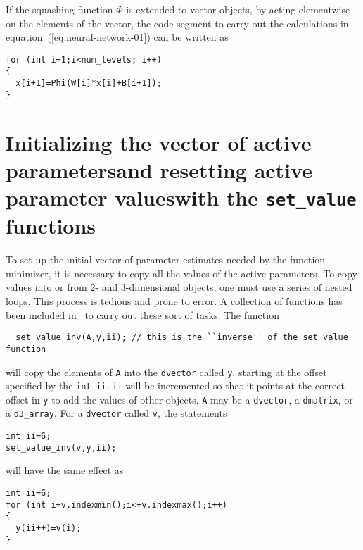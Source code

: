 \documentclass{admbmanual}
\begin{document}
If the squashing function $\Phi$ is extended to vector objects, by acting
elementwise on the elements of the vector, the code segment to carry out the
calculations in equation~(\ref{eq:neural-network-01}) %
can be written as
\begin{lstlisting}
for (int i=1;i<num_levels; i++)
{
  x[i+1]=Phi(W[i]*x[i]+B[i+1]);
}
\end{lstlisting}

\section{ Initializing the vector of active parameters\br and resetting
active parameter values\br with the \texttt{set\_value} functions}

To set up the initial vector of parameter estimates needed by the function
minimizer, it is necessary to copy all the values of the active parameters. To
copy values into or from 2- and 3-dimensional objects, one must use a series of
nested loops. This process is tedious and prone to error. A collection of
functions has been included in \scAD\ to carry out these sort of tasks. The
function
\begin{lstlisting}
  set_value_inv(A,y,ii); // this is the ``inverse'' of the set_value function
\end{lstlisting}
will copy the elements of \texttt{A} into the \texttt{dvector} called
\texttt{y}, starting at the offset specified by the \texttt{int ii}. \texttt{ii}
will be incremented so that it points at the correct offset in \texttt{y} to add
the values of other objects. \texttt{A} may be a \texttt{dvector}, a
\texttt{dmatrix}, or a \texttt{d3\_array}. For a \texttt{dvector} called
\texttt{v}, the statements
\begin{lstlisting}
int ii=6;
set_value_inv(v,y,ii);
\end{lstlisting}
will have the same effect as
\begin{lstlisting}
int ii=6;
for (int i=v.indexmin();i<=v.indexmax();i++)
{
  y(ii++)=v(i);
}
\end{lstlisting}
\end{document}
